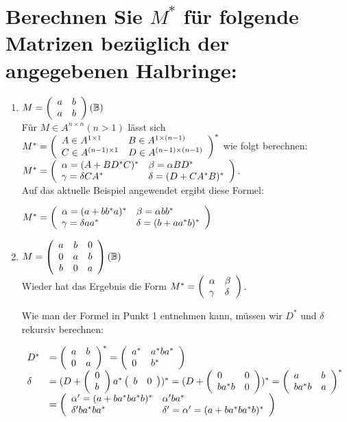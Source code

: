 \documentclass[]{scrartcl}
\newcommand{\matr}[2]{\left(\begin{array}{#1}#2\end{array}\right)}
\begin{document}
\setcounter{section}{6}

\section{Berechnen Sie $M^*$ für folgende Matrizen bezüglich der angegebenen Halbringe:}

\begin{enumerate}
	\item $ M = \matr{l l}{a & b \\ a & b} (\mathbb{B})$ \\
	
	Für $M \in A^{n \times n} (n>1)$ lässt sich
	$M^* = \matr{l l}{
		A \in A^{1 \times 1} & B \in A^{1 \times (n-1)} \\
	    C \in A^{(n-1) \times 1} & D \in A^{(n-1) \times (n-1)}
	}^*$
	wie folgt berechnen:
	$M^* = \matr{l l}{
		\alpha = (A + BD^*C)^* & \beta = \alpha BD^* \\
		\gamma = \delta CA^* & \delta = (D + CA^*B)^*
	}$.\\
	
	Auf das aktuelle Beispiel angewendet ergibt diese Formel:
	
	$M^* = \matr{l l}{
		\alpha = (a + bb^*a)^* & \beta = \alpha bb^* \\
		\gamma = \delta aa^* & \delta = (b + aa^*b)^*
	}$
	
	\item $ M = \matr{c c c}{a & b & 0 \\ 0 & a & b \\ b & 0 & a} (\mathbb{B})$ \\
	
	Wieder hat das Ergebnis die Form
	$M^* = \matr{l l l}{\alpha & \beta \\ \gamma & \delta}$.
	
	Wie man der Formel in Punkt 1 entnehmen kann, müssen wir $D^*$ und $\delta$ rekursiv berechnen:
	
	$\begin{array}{l l}
	D^* & = \matr{l l}{a & b \\ 0 & a}^* = \matr{l l}{a^* & a^*ba^* \\ 0 & b^*}\\
	\delta & = (D + \matr{l}{0 \\ b} a^* \matr{l l}{b & 0})^* = (D + \matr{l l}{0 & 0\\ba^*b & 0})^* =
		\matr{l l}{
			a & b \\
			ba^*b & a \\
		}^*\\
		& = \matr{l l}{ 
			\alpha' = (a + ba^*ba^*b)^* &
			\alpha' ba^*\\
			\delta' ba^*ba^* &
			\delta' = \alpha' = (a + ba^*ba^*b)^*\\
		}\\
	\end{array}
	$
	

\end{enumerate}
\end{document}
